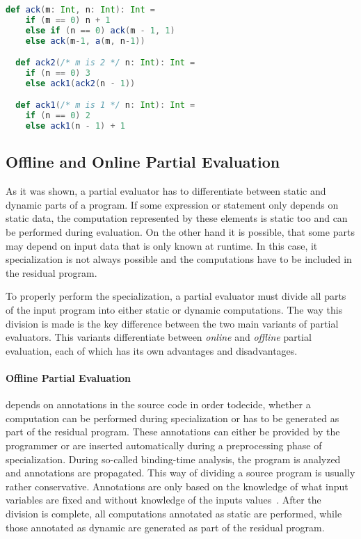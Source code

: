 \begin{lstlisting}[language=scala,caption={Definition of the \texttt{ackermann} function and its specialization.},label={lst:pps}]
  def ack(m: Int, n: Int): Int =
    if (m == 0) n + 1
    else if (n == 0) ack(m - 1, 1)
    else ack(m-1, a(m, n-1))

  def ack2(/* m is 2 */ n: Int): Int =
    if (n == 0) 3
    else ack1(ack2(n - 1))

  def ack1(/* m is 1 */ n: Int): Int =
    if (n == 0) 2
    else ack1(n - 1) + 1
\end{lstlisting}



\subsection{Offline and Online Partial Evaluation}\label{sec:offline-vs-online}

As it was shown, a partial evaluator has to differentiate between static and dynamic parts of a program.
If some expression or statement only depends on static data, the computation represented by these elements is static too and can be performed during evaluation.
On the other hand it is possible, that some parts may depend on input data that is only known at runtime.
In this case, it specialization is not always possible and the computations have to be included in the residual program.

To properly perform the specialization, a partial evaluator must divide all parts of the input program into either static or dynamic computations.
The way this division is made is the key difference between the two main variants of partial evaluators.
This variants differentiate between \textit{online} and \textit{offline} partial evaluation, each of which has its own advantages and disadvantages.

\paragraph{Offline Partial Evaluation}
depends on annotations in the source code in order to\linebreak decide, whether a computation can be performed during specialization or has to be generated as part of the residual program.
These annotations can either be provided by the programmer or are inserted automatically during a preprocessing phase of specialization.
During so-called binding-time analysis, the program is analyzed and annotations are propagated.
This way of dividing a source program is usually rather conservative.
Annotations are only based on the knowledge of what input variables are fixed and without knowledge of the inputs values~\cite[Chap. 7]{Jones_PartialEvaluation}.
After the division is complete, all computations annotated as static are performed, while those annotated as dynamic are generated as part of the residual program.


